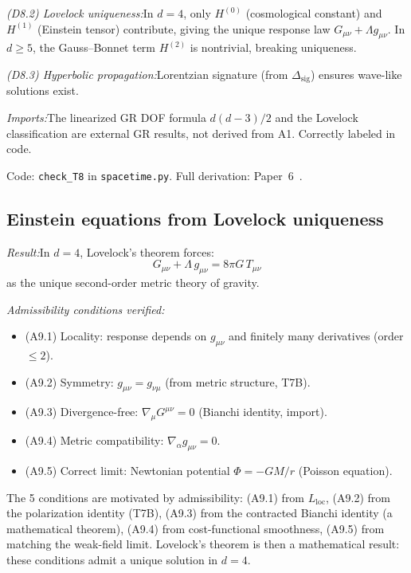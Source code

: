 \documentclass[11pt]{article}
\newcommand{\Lloc}{L_{\mathrm{loc}}}
\begin{document}
\textit{(D8.2) Lovelock uniqueness:}\quad In $d = 4$, only $H^{(0)}$ (cosmological constant) and $H^{(1)}$ (Einstein tensor) contribute, giving the unique response law $G_{\mu\nu} + \Lambda g_{\mu\nu}$.  In $d \ge 5$, the Gauss--Bonnet term $H^{(2)}$ is nontrivial, breaking uniqueness.

\textit{(D8.3) Hyperbolic propagation:}\quad Lorentzian signature (from $\Delta_{\mathrm{sig}}$) ensures wave-like solutions exist.

\textit{Imports:}\quad The linearized GR DOF formula $d(d-3)/2$ and the Lovelock classification are external GR results, not derived from A1.  Correctly labeled in code.

Code: \texttt{check\_T8} in \texttt{spacetime.py}.  Full derivation: Paper~6~\cite{P6}.


\subsection{Einstein equations from Lovelock uniqueness}

\begin{tcolorbox}[apfbox, title={T9\_grav: Einstein Equations from Five Admissibility Conditions}]
\textit{Result:}\quad In $d = 4$, Lovelock's theorem forces:
\begin{equation}
G_{\mu\nu} + \Lambda\, g_{\mu\nu} = 8\pi G\, T_{\mu\nu}
\end{equation}
as the unique second-order metric theory of gravity.

\smallskip\noindent\textit{Admissibility conditions verified:}
\begin{itemize}[nosep,leftmargin=2em]
\item (A9.1) Locality: response depends on $g_{\mu\nu}$ and finitely many derivatives (order $\le 2$).
\item (A9.2) Symmetry: $g_{\mu\nu} = g_{\nu\mu}$ (from metric structure, T7B).
\item (A9.3) Divergence-free: $\nabla_\mu G^{\mu\nu} = 0$ (Bianchi identity, import).
\item (A9.4) Metric compatibility: $\nabla_\alpha g_{\mu\nu} = 0$.
\item (A9.5) Correct limit: Newtonian potential $\Phi = -GM/r$ (Poisson equation).
\end{itemize}
\end{tcolorbox}

The 5 conditions are motivated by admissibility: (A9.1) from $\Lloc$, (A9.2) from the polarization identity (T7B), (A9.3) from the contracted Bianchi identity (a mathematical theorem), (A9.4) from cost-functional smoothness, (A9.5) from matching the weak-field limit.  Lovelock's theorem is then a mathematical result: these conditions admit a unique solution in $d = 4$.
\end{document}
